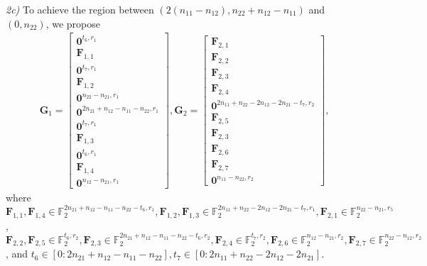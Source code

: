 \documentclass[12pt, draftclsnofoot, onecolumn]{IEEEtran}
\theoremstyle{definition}
\begin{document}
\emph{2c)} To achieve the region between $(2(n_{11}-n_{12}),n_{22}+n_{12}-n_{11})$ and $(0,n_{22})$, we propose
\begin{align}\label{eq:E1_case3}
\boldsymbol{G}_1 = \begin{bmatrix}
\boldsymbol{0}^{t_6,r_1}\\
\boldsymbol{F}_{1,1}\\
\boldsymbol{0}^{t_7,r_1} \\
\boldsymbol{F}_{1,2} \\
\boldsymbol{0}^{n_{22}-n_{21},r_1}\\
\boldsymbol{0}^{2n_{21}+n_{12}-n_{11}-n_{22},r_1}\\
\boldsymbol{0}^{t_7,r_1}\\
\boldsymbol{F}_{1,3} \\
\boldsymbol{0}^{t_6,r_1}\\
\boldsymbol{F}_{1,4}\\
\boldsymbol{0}^{n_{12}-n_{21},r_1}
\end{bmatrix},
\boldsymbol{G}_2 = \begin{bmatrix}
\boldsymbol{F}_{2,1} \\
\boldsymbol{F}_{2,2} \\
\boldsymbol{F}_{2,3} \\
\boldsymbol{F}_{2,4} \\
\boldsymbol{0}^{2n_{11}+n_{22}-2n_{12}-2n_{21}-t_7,r_2} \\
\boldsymbol{F}_{2,5} \\
\boldsymbol{F}_{2,3} \\
\boldsymbol{F}_{2,6} \\
\boldsymbol{F}_{2,7} \\
\boldsymbol{0}^{n_{11}-n_{22},r_2}
\end{bmatrix},
\end{align}
where $\boldsymbol{F}_{1,1}, \boldsymbol{F}_{1,4}\in \mathbb{F}_2^{2n_{21}+n_{12}-n_{11}-n_{22}-t_6,r_1},\boldsymbol{F}_{1,2},\boldsymbol{F}_{1,3} \in \mathbb{F}_2^{2n_{11}+n_{22}-2n_{12}-2n_{21}-t_7,r_1},\boldsymbol{F}_{2,1}\in \mathbb{F}_2^{n_{22}-n_{21},r_5}$, \\$\boldsymbol{F}_{2,2},\boldsymbol{F}_{2,5}\in \mathbb{F}_2^{t_6,r_2},\boldsymbol{F}_{2,3}\in \mathbb{F}_2^{2n_{21}+n_{12}-n_{11}-n_{22}-t_6,r_2},\boldsymbol{F}_{2,4}\in \mathbb{F}_2^{t_7,r_2},\boldsymbol{F}_{2,6} \in \mathbb{F}_2^{n_{12}-n_{21},r_2},\boldsymbol{F}_{2,7} \in \mathbb{F}_2^{n_{22}-n_{12},r_2}$, and $t_6 \in [0:2n_{21}+n_{12}-n_{11}-n_{22}],t_7 \in [0:2n_{11}+n_{22}-2n_{12}-2n_{21}]$.
\end{document}
